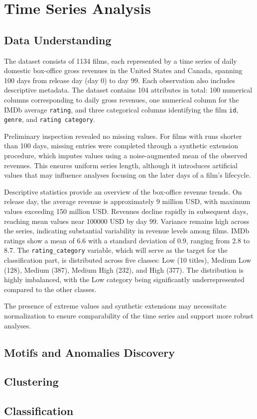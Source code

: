 \section{Time Series Analysis}

\subsection{Data Understanding}

The dataset consists of 1134 films, each represented by a time series of daily domestic 
box-office gross revenues in the United States and Canada, spanning 100 days from release day (day 0) 
to day 99. Each observation also includes descriptive metadata. The dataset contains 104 attributes in 
total: 100 numerical columns corresponding to daily gross revenues, one numerical column for the IMDb average \texttt{rating}, 
and three categorical columns identifying the film \texttt{id}, \texttt{genre}, and \texttt{rating category}.

Preliminary inspection revealed no missing values. For films with runs shorter than 100 days, 
missing entries were completed through a synthetic extension procedure, which imputes values using a noise-augmented mean 
of the observed revenues. This ensures uniform series length, although it introduces artificial values that may influence 
analyses focusing on the later days of a film’s lifecycle.

Descriptive statistics provide an overview of the box-office revenue trends. 
On release day, the average revenue is approximately 9 million USD, with maximum values exceeding 150 million USD. 
Revenues decline rapidly in subsequent days, reaching mean values near 100000 USD by day 99. 
Variance remains high across the series, indicating substantial variability in revenue levels among films.
IMDb ratings show a mean of 6.6 with a standard deviation of 0.9, ranging from 2.8 to 8.7.
The \texttt{rating\_category} variable, which will serve as the target for the classification part, 
is distributed across five classes: Low (10 titles), Medium Low (128), Medium (387), Medium High (232), and High (377). 
The distribution is highly imbalanced, with the Low category being significantly underrepresented compared to the other classes.


The presence of extreme values and synthetic extensions may necessitate normalization to ensure comparability 
of the time series and support more robust analyses.



\subsection{Motifs and Anomalies Discovery}



\subsection{Clustering}

\subsection{Classification}